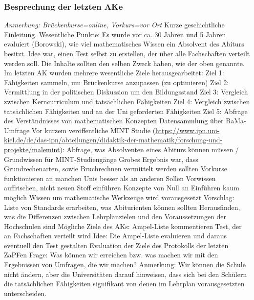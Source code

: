 \subsubsection*{Besprechung der letzten AKe}
\begin{outline}
\1 \textit{Anmerkung: Brückenkurse=online, Vorkurs=vor Ort}
\1 Kurze geschichtliche Einleitung. Wesentliche Punkte:
\2 Es wurde vor ca. 30 Jahren und 5 Jahren evaluiert (Borowski), wie viel mathematisches Wissen ein Absolvent des Abiturs besitzt.
\2 Idee war, einen Test selbst zu erstellen, der über alle Fachschaften verteilt werden soll. Die Inhalte sollten den selben Zweck haben, wie der oben genannte.
\2 Im letzten AK wurden mehrere wesentliche Ziele herausgearbeitet:
\3 Ziel 1: Fähigkeiten sammeln, um Brückenkurse anzupassen (zu optimieren)
\3 Ziel 2: Vermittlung in der politischen Diskussion um den Bildungsstand
\3 Ziel 3: Vergleich zwischen Kerncurriculum und tatsächlichen Fähigkeiten
\3 Ziel 4: Vergleich zwischen tatsächlichen Fähigkeiten und an der Uni geforderten Fähigkeiten
\3 Ziel 5: Abfrage des Verständnisses von mathematischen Konzepten
\1 Datensammlung über BaMa-Umfrage
				\1 Vor kurzem veröffentliche MINT Studie (\url{https://www.ipn.uni-kiel.de/de/das-ipn/abteilungen/didaktik-der-mathematik/forschung-und-projekte/malemint}):
					\2 Abfrage, was Absolventen eines Abiturs können müssen / Grundwissen für MINT-Studiengänge
					\2 Grobes Ergebnis war, dass Grundrechenarten, sowie Bruchrechnen vermittelt werden sollten
				\1 Vorkurse funktionieren an manchen Unis besser als an anderen
					\2 Sollen Vorwissen auffrischen, nicht neuen Stoff einführen
					\2 Konzepte von Null an Einführen kaum möglich
					\2 Wissen um mathematische Werkzeuge wird vorausgesetzt
				\1 Vorschlag: Liste von Standards erarbeiten, was Abiturienten können sollten
				\1 Herausfinden, was die Differenzen zwischen Lehrplanzielen und den Voraussetzungen der Hochschulen sind
				\1 Mögliche Ziele des AKs:
					\2 Ampel-Liste kommentieren
					\2 \flqq Test\frqq, der an Fachschaften verteilt wird
				\1 Idee: Die Ampel-Liste evaluieren und daraus eventuell den Test gestalten
				\1 Evaluation der Ziele des Protokolls der letzten ZaPFen
				\1 Frage: Was können wir erreichen bzw. was machen wir mit den Ergebnissen von Umfragen, die wir machen?
				\1 Anmerkung: Wir können die Schule nicht ändern, aber die Universitäten darauf hinweisen, dass sich bei den Schülern die tatsächlichen Fähigkeiten signifikant von denen im Lehrplan vorausgesetzten unterscheiden.
			\end{outline}

